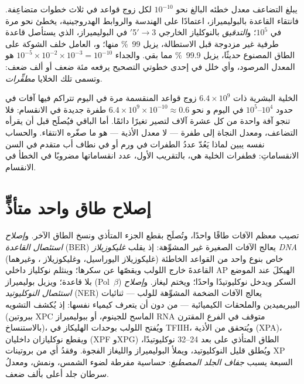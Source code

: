 \begin{proposition}[سلّم الأمانة]\label{prop:b3:dna-repair:fidelity}
يبلغ التضاعف معدل خطئه البالغ نحو $10^{-10}$ لكل زوج قواعد في ثلاث
خطوات متضاعِفة. فانتقاء القاعدة بالبوليميراز، اعتمادًا على الهندسة
والروابط الهدروجينية، يخطئ نحو مرة في $10^{5}$؛ و\emph{التدقيق}
بالنوكلياز الخارجي 3$'\to$5$'$ في البوليميراز، الذي يستأصل قاعدة
طرفية غير مزدوجة قبل الاستطالة، يزيل \qty{99}{\%} منها؛ و\emph{}، العامل خلف الشوكة على الطاق المصنوع حديثًا، يزيل
\qty{99.9}{\%} مما بقي. والجداء
$10^{-5}\times 10^{-2}\times 10^{-3} = 10^{-10}$ هو المعدل المرصود،
وأي خلل في إحدى خطوتي التصحيح يرفعه مئة ضعف أو ألف ضعف: وتسمى تلك
الخلايا \emph{مطفِّرات}.
\end{proposition}

\begin{example}\label{ex:b3:dna-repair:numbers}
الخلية البشرية ذات $6.4\times 10^{9}$ زوج قواعد المنقسمة مرة في اليوم
تتراكم فيها آفات في حدود $10^{4}$--$10^{5}$ في اليوم و
نحو $6.4\times 10^{9}\times 10^{-10} \approx 0.6$ طفرة جديدة في
الانقسام: فلا تنجو آفة واحدة من كل عشرة آلاف لتصير تغيرًا دائمًا.
أما الباقي فيُصلَح قبل أن يقرأه التضاعف، ومعدل النجاة إلى طفرة ---
لا معدل الأذية --- هو ما صغّره الانتقاء. والحساب نفسه يبين لماذا يَعُدّ
عددُ الطفرات في ورم أو في نطاف أب متقدم في السن الانقساماتِ: فطفرات
الخلية هي، بالتقريب الأول، عدد انقساماتها مضروبًا في الخطأ في الانقسام.
\end{example}

\section{إصلاح طاق واحد متأذٍّ}

\begin{definition}\label{def:b3:dna-repair:excision}
تصيب معظم الآفات طاقًا واحدًا، وتُصلَح بقطع الجزء المتأذي ونسخ الطاق
الآخر. و\emph{إصلاح استئصال القاعدة}
(BER) يعالج الآفات الصغيرة غير المشوِّهة: إذ يقلب \emph{غليكوزيلاز DNA}
خاص بنوع واحد من القواعد الخاطئة (غليكوزيلاز اليوراسيل، وغليكوزيلاز
، وغيرهما) القاعدةَ خارج اللولب ويقصّها عن سكرها؛
وينثلم نوكلياز داخلي AP الهيكلَ عند الموضع بلا قاعدة؛ ويزيل
بوليميراز (Pol~$\beta$) السكر ويدخل نوكليوتيدًا واحدًا؛ ويختم ليغاز.
و\emph{إصلاح استئصال النوكليوتيد}
(NER) يعالج الآفات الضخمة المشوِّهة للولب --- ثنائيات البيريميدين
والملحقات الكيميائية --- من دون أن يتعرف كيمياء 
نفسها: إذ يُكشف التشويه (ببروتين XPC الماسح للجينوم، أو ببوليميراز
RNA متوقف في الفرع المقترن بالاستنساخ)، ويُفتح
اللولب بوحدات الهليكاز في TFIIH، ويُتحقق من الأذية (XPA)،
ويقطع نوكليازان داخليان (XPF وXPG) الطاق المتأذي
على بعد \numrange{24}{32} نوكليوتيدًا، ويُطلق قليل النوكليوتيد،
ويملأ البوليميراز والليغاز الفجوة. وفقدُ أي من بروتينات
XP السبعة يسبب \emph{جفاف الجلد المصطبغ}: حساسية مفرطة لضوء
الشمس، ونمش، ومعدلُ سرطان جلد أعلى بألف ضعف.
\end{definition}

